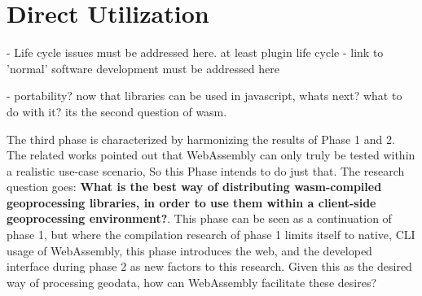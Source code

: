 
\section{Direct Utilization}
\label{sec:method-three}
\mySubRQThree

\begin{note}
  - Life cycle issues must be addressed here. at least plugin life cycle
  - link to 'normal' software development must be addressed here 

  - portability? now that libraries can be used in javascript, whats next? what to do with it? its the second question of wasm.

\end{note}








The third phase is characterized by harmonizing the results of Phase 1 and 2. 
The related works pointed out that WebAssembly can only truly be tested within a realistic use-case scenario, So this Phase intends to do just that.
The research question goes: \textbf{What is the best way of distributing wasm-compiled geoprocessing libraries, in order to use them within a client-side geoprocessing environment?}. 
This phase can be seen as a continuation of phase 1, but where the compilation research of phase 1 limits itself to native, CLI usage of WebAssembly, this phase introduces the web, and the developed interface during phase 2 as new factors to this research. Given this as the desired way of processing geodata, how can WebAssembly facilitate these desires? 

